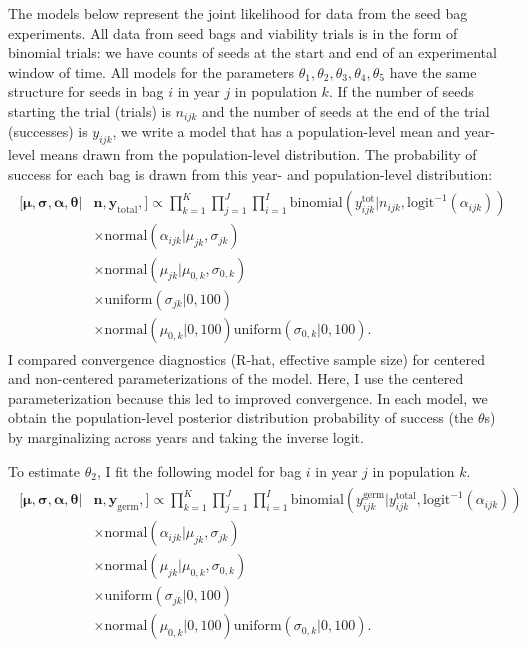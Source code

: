 \documentclass[12pt, oneside, titlepage]{article}   	%
\begin{document}
The models below represent the joint likelihood for data from the seed bag experiments. All data from seed bags and viability trials is in the form of binomial trials: we have counts of seeds at the start and end of an experimental window of time. All models for the parameters $\theta_1, \theta_2, \theta_3, \theta_4, \theta_5$ have the same structure for seeds in bag $i$ in year $j$ in population $k$. If the number of seeds starting the trial (trials) is $n_{ijk}$ and the number of seeds at the end of the trial (successes) is $y_{ijk}$, we write a model that has a population-level mean and year-level means drawn from the population-level distribution. The probability of success for each bag is drawn from this year- and population-level distribution:
%
\begin{align}
  \begin{split}
 [ \bm{\mu}, \bm{\sigma}, \bm{\alpha}, \bm{\theta} | & \bm{n}, \bm{y_{\mathrm{total}}},  ] \propto  \prod_{k=1}^{K} \prod_{j=1}^{J} \prod_{i=1}^{I} 
   \mathrm{binomial} ( y^{\mathrm{tot}}_{ijk} | n_{ijk}, \mathrm{logit}^{-1}( \alpha_{ijk} ) ) 
   \\ & \times \mathrm{normal} ( \alpha_{ijk}  | \mu_{jk}, \sigma{_{jk} })
  \\ & \times \mathrm{normal} ( \mu_{jk}  | \mu_{0,k}, \sigma{_{0,k} })
  \\ & \times \mathrm{uniform} ( \sigma_{jk} | 0,100)
  \\ & \times \mathrm{normal} ( \mu_{0,k} | 0 , 100 ) \mathrm{uniform} ( \sigma_{0,k} | 0,100).
  \end{split}
\end{align}
%
I compared convergence diagnostics (R-hat, effective sample size) for centered and non-centered parameterizations of the model. Here, I use the centered parameterization because this led to improved convergence. In each model, we obtain the population-level posterior distribution probability of success (the $\theta$s) by marginalizing across years and taking the inverse logit.

\iffalse
To estimate $\theta_2$, I fit the following model for bag $i$ in year $j$ in population $k$. 
%
\begin{align}
  \begin{split}
 [ \bm{\mu}, \bm{\sigma}, \bm{\alpha}, \bm{\theta} | & \bm{n}, \bm{y_{\mathrm{germ}}},  ] \propto  \prod_{k=1}^{K} \prod_{j=1}^{J} \prod_{i=1}^{I} 
   \mathrm{binomial} ( y^{\mathrm{germ}}_{ijk} | y^{\mathrm{total}}_{ijk}, \mathrm{logit}^{-1}( \alpha_{ijk} ) ) 
   \\ & \times \mathrm{normal} ( \alpha_{ijk}  | \mu_{jk}, \sigma{_{jk} })
  \\ & \times \mathrm{normal} ( \mu_{jk}  | \mu_{0,k}, \sigma{_{0,k} })
  \\ & \times \mathrm{uniform} ( \sigma_{jk} | 0,100)
  \\ & \times \mathrm{normal} ( \mu_{0,k} | 0 , 100 ) \mathrm{uniform} ( \sigma_{0,k} | 0,100).
  \end{split}
\end{align}
%
\end{document}
